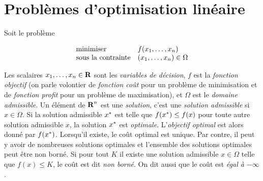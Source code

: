 \section{Problèmes d'optimisation linéaire}

Soit le problème

$$
\begin{array}{ll}
  \mbox{minimiser}   &  f(x_1, \ldots, x_n) \\
  \mbox{sous la contrainte} &  (x_1, \ldots, x_n)  \in \Omega
\end{array}
$$


Les scalaires $x_1, \ldots, x_n \in {\mbox{\bf R}}$ sont les \emph{variables de décision}, $f$  est la \emph{fonction objectif}
(on parle volontier de \emph{fonction coût} pour un problème de minimisation et de \emph{fonction profit} pour un problème de maximisation), et
$\Omega$ est le \emph{domaine admissible}. Un élément de ${\mbox{\bf R}}^n$ est une \emph{solution}, c'est une \emph{solution admissible}   si
$x
\in \Omega$. Si la solution admissible
$x^*$ est telle que
$f(x^*) \leq f(x)$ pour toute autre solution admissible
$x$,  la solution $x^*$ est \emph{optimale}. L'\emph{objectif optimal}   est alors donné par
$f(x^*)$. Lorsqu'il existe, le coût optimal est unique. Par contre, il peut y avoir de nombreuses solutions optimales et l'ensemble des solutions
optimales peut être non borné. Si pour tout
$K$ il existe une solution admissible $x \in \Omega$ telle que $f(x) \leq K$, le coût est dit \emph{non borné}. On
dit aussi que le  coût est \emph{égal à
$-\infty$}.\\

\newpage



